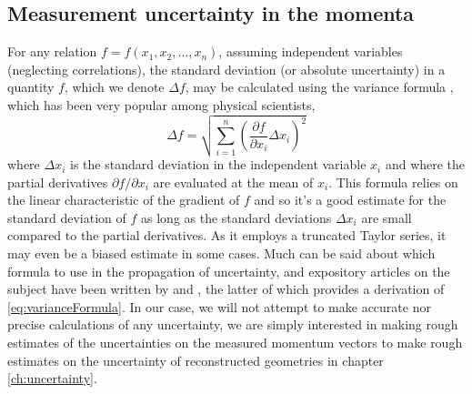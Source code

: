 \subsection{Measurement uncertainty in the momenta}
For any relation $f = f(x_1, x_2, \dots, x_n)$, assuming independent variables (neglecting correlations), the standard deviation (or absolute uncertainty) in a quantity $f$, which we denote $\Delta f$, may be calculated using the variance formula \citep{Ku1966}, which has been very popular among physical scientists,
\begin{equation} \label{eq:varianceFormula}
\Delta f = \sqrt{\sum_{i=1}^{n} \left( \frac{\partial f}{\partial x_i} \Delta x_i \right)^2}
\end{equation}
where $\Delta x_i$ is the standard deviation in the independent variable $x_i$ and where the partial derivatives $\partial f/\partial x_i$ are evaluated at the mean of $x_i$. This formula relies on the linear characteristic of the gradient of $f$ and so it's a good estimate for the standard deviation of $f$ as long as the standard deviations $\Delta x_i$ are small compared to the partial derivatives. As it employs a truncated Taylor series, it may even be a biased estimate in some cases. Much can be said about which formula to use in the propagation of uncertainty, and expository articles on the subject have been written by \citet{Birge39} and \citet{Ku1966}, the latter of which provides a derivation of \eqref{eq:varianceFormula}. In our case, we will not attempt to make accurate nor precise calculations of any uncertainty, we are simply interested in making rough estimates of the uncertainties on the measured momentum vectors to make rough estimates on the uncertainty of reconstructed geometries in chapter \ref{ch:uncertainty}.

